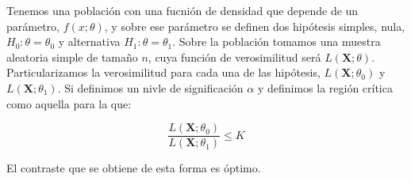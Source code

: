 

Tenemos una poblaci\'on con una fucni\'on de densidad que depende de un par\'ametro, $f(x;\theta)$, y sobre ese par\'ametro se definen dos hip\'otesis simples, nula, $H_0:\theta=\theta_0$ y alternativa $H_1:\theta=\theta_1$. Sobre la poblaci\'on tomamos una muestra aleatoria simple de tama\~no $n$, cuya funci\'on de verosimilitud ser\'a $L(\boldsymbol{X};\theta)$. Particularizamos la verosimilitud para cada una de las hip\'otesis, $L(\boldsymbol{X};\theta_0)$ y $L(\boldsymbol{X};\theta_1)$. Si definimos un nivle de significaci\'on $\alpha$ y definimos la regi\'on cr\'itica como aquella para la que:

\begin{equation*}
\dfrac{L(\boldsymbol{X};\theta_0)}{L(\boldsymbol{X};\theta_1)}\leq K
\end{equation*}

El contraste que se obtiene de esta forma es \'optimo.


